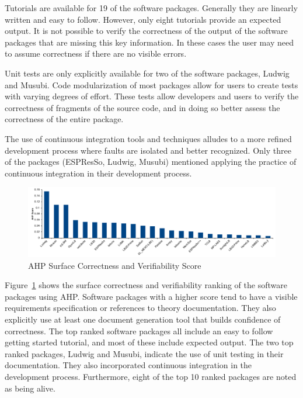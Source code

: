 \documentclass[final, 3p, times, authoryear]{elsarticle}
\begin{document}
Tutorials are available for 19 of the software packages. Generally they are
linearly written and easy to follow. However, only eight tutorials provide an
expected output. It is not possible to verify the correctness of the output of
the software packages that are missing this key information. In these cases the
user may need to assume correctness if there are no visible errors.

Unit tests are only explicitly available for two of the software packages,
Ludwig and Musubi. Code modularization of most packages allow for users to create tests with varying degrees of effort. These tests allow developers and users to verify the correctness of fragments of the source code, and in doing so better assess the correctness of the entire package.

The use of continuous integration tools and techniques alludes to a more refined
development process where faults are isolated and better recognized. Only three of the packages (ESPResSo, Ludwig, Musubi) mentioned applying the practice of continuous integration in their development process. 

\begin{figure}[h!]
	\begin{center}
		\includegraphics[width=1.0\textwidth]{./figures/correctnessverifiability.pdf}
		\caption{AHP Surface Correctness and Verifiability Score}
		\label{Fig_CorrectnessVerifiability}
	\end{center}
\end{figure}

Figure~\ref{Fig_CorrectnessVerifiability} shows the surface correctness and
verifiability ranking of the software packages using AHP. Software packages with
a higher score tend to have a visible requirements specification or references
to theory documentation. They also explicitly use at least one document
generation tool that builds confidence of correctness. The top ranked software
packages all include an easy to follow getting started tutorial, and most of
these include expected output. The two top ranked packages, Ludwig and Musubi, indicate the use of unit testing in their documentation. They also incorporated continuous integration in the development process. Furthermore, eight of the top 10 ranked packages are noted as being alive.
\end{document}
